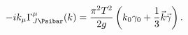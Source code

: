 \begin{equation}
\label{eq:gamma_high}
-ik_\mu\Gamma_{J\smash[t]{\Psibar}}^\mu(k)
=\frac{\pi^2T^2}{2g}
\left(k_0\gamma_0+\frac{1}{3}\vec k\vec\gamma\right).
\end{equation}

